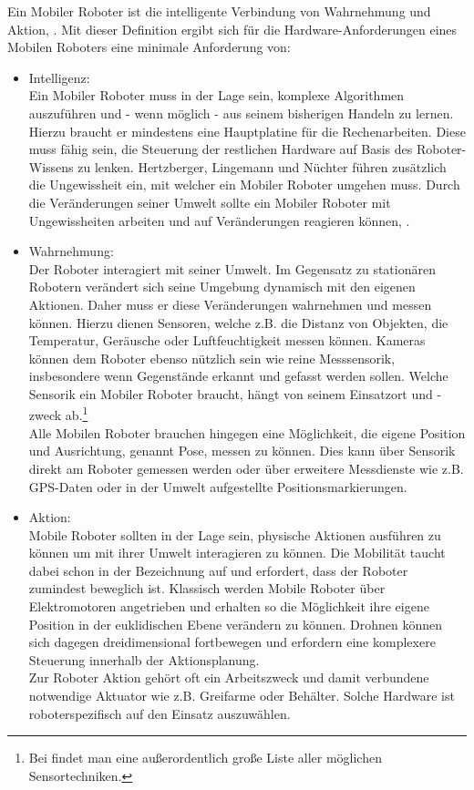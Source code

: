 \documentclass[twoside,11pt, a4paper]{report}
\begin{document}
	Ein Mobiler Roboter ist die intelligente Verbindung von Wahrnehmung und Aktion, \cite{McKerrow1991}. Mit dieser Definition ergibt sich für die Hardware-Anforderungen eines Mobilen Roboters eine minimale Anforderung von: 
	\begin{itemize}
		\item Intelligenz: \\
		Ein Mobiler Roboter muss in der Lage sein, komplexe Algorithmen auszuführen und - wenn möglich - aus seinem bisherigen Handeln zu lernen. Hierzu braucht er mindestens eine Hauptplatine für die Rechenarbeiten. Diese muss fähig sein, die Steuerung der restlichen Hardware auf Basis des Roboter-Wissens zu lenken. Hertzberger, Lingemann und Nüchter führen zusätzlich die Ungewissheit ein, mit welcher ein Mobiler Roboter umgehen muss. Durch die Veränderungen seiner Umwelt sollte ein Mobiler Roboter mit Ungewissheiten arbeiten und auf Veränderungen reagieren können, \cite{HeLiNue2012}.
		\item Wahrnehmung: \\
		Der Roboter interagiert mit seiner Umwelt. Im Gegensatz zu stationären Robotern verändert sich seine Umgebung dynamisch mit den eigenen Aktionen. Daher muss er diese Veränderungen wahrnehmen und messen können. Hierzu dienen Sensoren, welche z.B. die Distanz von Objekten, die Temperatur, Geräusche oder Luftfeuchtigkeit messen können. Kameras können dem Roboter ebenso nützlich sein wie reine Messsensorik, insbesondere wenn Gegenstände erkannt und gefasst werden sollen. Welche Sensorik ein Mobiler Roboter braucht, hängt von seinem Einsatzort und -zweck ab.\footnote{Bei \cite{Hering2012} findet man eine außerordentlich große Liste aller möglichen Sensortechniken.} \\
		Alle Mobilen Roboter brauchen hingegen eine Möglichkeit, die eigene Position und Ausrichtung, genannt Pose, messen zu können. Dies kann über Sensorik direkt am Roboter gemessen werden oder über erweitere Messdienste wie z.B. GPS-Daten oder in der Umwelt aufgestellte Positionsmarkierungen. 
		\item Aktion:\\
		Mobile Roboter sollten in der Lage sein, physische Aktionen ausführen zu können um mit ihrer Umwelt interagieren zu können. Die Mobilität taucht dabei schon in der Bezeichnung auf und erfordert, dass der Roboter zumindest beweglich ist. Klassisch werden Mobile Roboter über Elektromotoren angetrieben und erhalten so die Möglichkeit ihre eigene Position in der euklidischen Ebene verändern zu können. Drohnen können sich dagegen dreidimensional fortbewegen und erfordern eine komplexere Steuerung innerhalb der Aktionsplanung.\\
		Zur Roboter Aktion gehört oft ein Arbeitszweck und damit verbundene notwendige Aktuator wie z.B. Greifarme oder Behälter. Solche Hardware ist roboterspezifisch auf den Einsatz auszuwählen. 
	\end{itemize}
	
\end{document}
